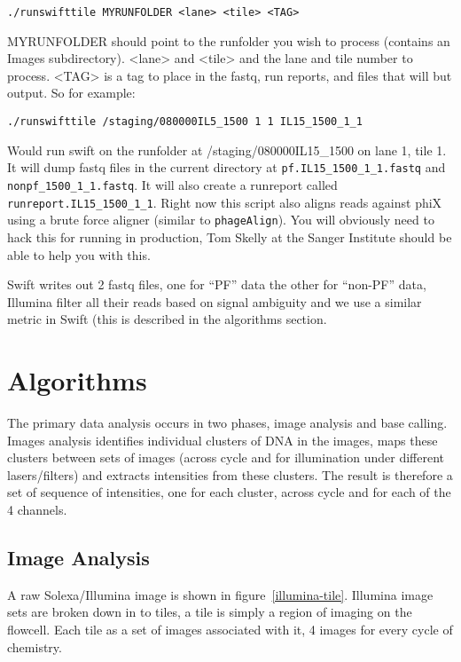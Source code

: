 \documentclass{report}
\begin{document}
\begin{verbatim}
./runswifttile MYRUNFOLDER <lane> <tile> <TAG>
\end{verbatim}

MYRUNFOLDER should point to the runfolder you wish to process (contains an Images subdirectory). <lane> and <tile> and the lane and tile number to process. <TAG> is a tag to place in the fastq, run reports, and files that will but output. So for example:

\begin{verbatim}
./runswifttile /staging/080000IL5_1500 1 1 IL15_1500_1_1
\end{verbatim}

Would run swift on the runfolder at /staging/080000IL15\_1500 on lane 1, tile 1. It will dump fastq files in the current directory at \texttt{pf.IL15\_1500\_1\_1.fastq} and \texttt{nonpf\_1500\_1\_1.fastq}. It will also create a runreport called \texttt{runreport.IL15\_1500\_1\_1}. Right now this script also aligns reads against phiX using a brute force aligner (similar to \texttt{phageAlign}). You will obviously need to hack this for running in production, Tom Skelly at the Sanger Institute should be able to help you with this.

Swift writes out 2 fastq files, one for ``PF'' data the other for ``non-PF'' data, Illumina filter all their reads based on signal ambiguity and we use a similar metric in Swift (this is described in the algorithms section.

\chapter{Algorithms}

The primary data analysis occurs in two phases, image analysis and base calling. Images analysis identifies individual clusters of DNA in the images, maps these clusters between sets of images (across cycle and for illumination under different lasers/filters) and extracts intensities from these clusters. The result is therefore a set of sequence of intensities, one for each cluster, across cycle and for each of the 4 channels.

\section{Image Analysis}

A raw Solexa/Illumina image is shown in figure~\ref{illumina-tile}. Illumina image sets are broken down in to tiles, a tile is simply a region of imaging on the flowcell. Each tile as a set of images associated with it, 4 images for every cycle of chemistry. 
\end{document}
